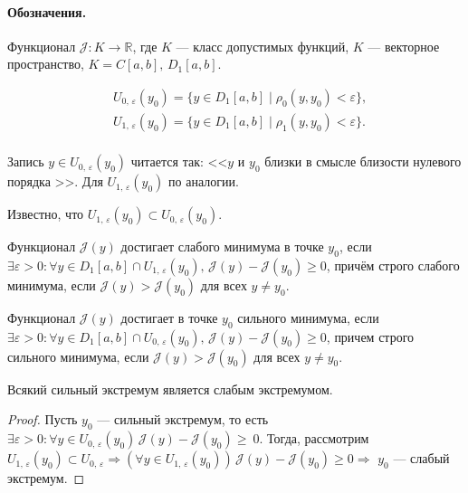 
\paragraph{Обозначения. } Функционал $ \mathcal{J}: K \to \mathbb{R} $, где $ K $ --- класс допустимых функций, $ K $ --- векторное пространство, $ K = C[a, b], \, D_1[a, b]$.

\begin{align*}
	&U_{0, \, \varepsilon}(y_0) = \{ y \in D_1[a, b] \mid \rho_0(y, y_0) < \varepsilon \}, \\
	&U_{1, \, \varepsilon}(y_0) = \{ y \in D_1[a, b] \mid \rho_1(y, y_0) < \varepsilon \}. \\
\end{align*}

Запись $ y \in U_{0, \, \varepsilon}(y_0) $ читается так: <<$ y $ и $ y_0 $ близки в смысле близости нулевого порядка >>. Для $  U_{1, \, \varepsilon}(y_0) $ по аналогии.

Известно, что $ U_{1, \, \varepsilon}(y_0) \subset  U_{0, \, \varepsilon}(y_0)$.

\begin{definition}
	Функционал $\mathcal{J}(y)$ достигает слабого минимума в точке $ y_0 $, если $ \exists \varepsilon > 0: \forall y \in D_1[a, b] \cap U_{1, \, \varepsilon}(y_0), \, \mathcal{J}(y) - \mathcal{J}(y_0) \geqslant 0$, причём строго слабого минимума, если $ \mathcal{J}(y) > \mathcal{J}(y_0) $ для всех $ y \not = y_0$.
\end{definition}

\begin{definition}
	Функционал $ \mathcal{J}(y) $ достигает в точке $ y_0 $ сильного минимума, если $ \exists \varepsilon > 0: \forall y \in D_1[a, b] \cap U_{0, \, \varepsilon}(y_0), \, \mathcal{J}(y) - \mathcal{J}(y_0) \geqslant 0 $, причем строго сильного минимума, если $ \mathcal{J}(y) > \mathcal{J}(y_0) $ для всех $ y \not = y_0$.
\end{definition}

\begin{utv}
	Всякий сильный экстремум является слабым экстремумом.
\end{utv}
\begin{proof}
	Пусть $ y_0 $ --- сильный экстремум, то есть $ \exists \varepsilon > 0: \forall y \in U_{0, \, \varepsilon}(y_0) \, \mathcal{J}(y) - \mathcal{J}(y_0) \geqslant~0$.
	Тогда, рассмотрим $ U_{1, \, \varepsilon}(y_0) \subset U_{0, \, \varepsilon} \Rightarrow (
	\forall y \in U_{1, \, \varepsilon}(y_0)) \, \mathcal{J}(y) - \mathcal{J}(y_0) \geqslant 0 \Rightarrow $ $ y_0 $ --- слабый экстремум.  
\end{proof}

